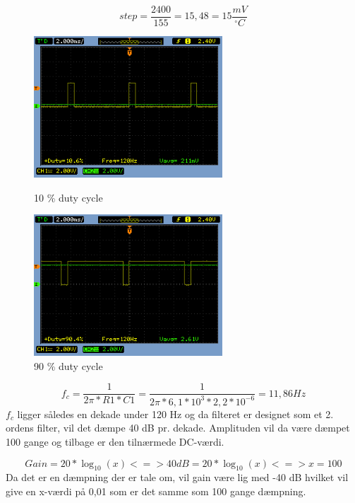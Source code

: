 \begin{equation}
step = \frac{2400}{155} = 15,48 = 15 \frac{mV}{^{\circ}C}
\end{equation}

\begin{figure}[htb]
\begin{minipage}{0.4\textwidth} 
\includegraphics[height=150pt]{filer/design/Billeder/sht_dutycycle10.png}
\caption{\textnormal{10 \% duty cycle}}
\label{lab:sht_dc10}
\end{minipage}
\hspace{0.10\textwidth}
\begin{minipage}{0.4\textwidth}
\includegraphics[height=150pt]{filer/design/Billeder/sht_dutycycle90.png}
\caption{\textnormal{90 \% duty cycle}}
\label{lab:sht_dc90}
\end{minipage}
\hfill
\end{figure}

\begin{equation}
f_c = \frac{1}{2 \pi * R1 * C1} = \frac{1}{2 \pi * 6,1*10^3  * 2,2*10^{-6}} = 11,86 Hz
\end{equation}
$f_c$ ligger således en dekade under 120 Hz og da filteret er designet som et 2. ordens filter, vil det dæmpe 40 dB pr. dekade. Amplituden vil da være dæmpet 100 gange og tilbage er den tilnærmede DC-værdi.  

\begin{equation}
Gain = 20 * \log_{10}(x) <=> 40 dB = 20 * \log_ {10}(x) <=> x = 100
\end{equation} 
Da det er en dæmpning der er tale om, vil gain være lig med -40 dB hvilket vil give en x-værdi på 0,01 som er det samme som 100 gange dæmpning.

